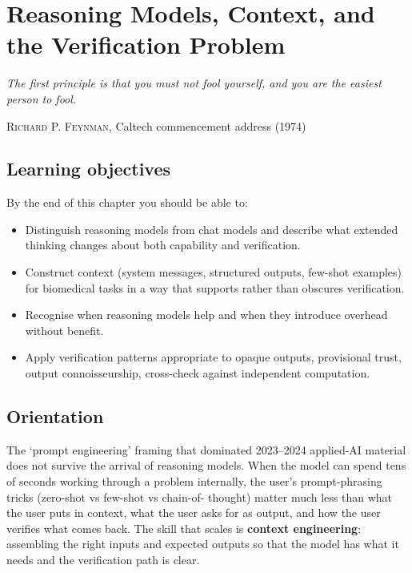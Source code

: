 \documentclass[
  letterpaper,
  11pt]{scrbook}
\providecommand{\tightlist}{%
  \setlength{\itemsep}{0pt}\setlength{\parskip}{0pt}}
\begin{document}
\chapter{Reasoning Models, Context, and the Verification
Problem}\label{sec-reasoning-context}

\begin{flushright}\small

\emph{The first principle is that you must not fool yourself, and you
are the easiest person to fool.}

\textsc{Richard P. Feynman}, Caltech commencement address (1974)

\end{flushright}

\section{Learning objectives}\label{learning-objectives-2}

By the end of this chapter you should be able to:

\begin{itemize}
\tightlist
\item
  Distinguish reasoning models from chat models and describe what
  extended thinking changes about both capability and verification.
\item
  Construct context (system messages, structured outputs, few-shot
  examples) for biomedical tasks in a way that supports rather than
  obscures verification.
\item
  Recognise when reasoning models help and when they introduce overhead
  without benefit.
\item
  Apply verification patterns appropriate to opaque outputs, provisional
  trust, output connoisseurship, cross-check against independent
  computation.
\end{itemize}

\section{Orientation}\label{orientation-2}

The `prompt engineering' framing that dominated 2023--2024 applied-AI
material does not survive the arrival of reasoning models. When the
model can spend tens of seconds working through a problem internally,
the user's prompt-phrasing tricks (zero-shot vs few-shot vs chain-of-
thought) matter much less than what the user puts in context, what the
user asks for as output, and how the user verifies what comes back. The
skill that scales is \textbf{context engineering}: assembling the right
inputs and expected outputs so that the model has what it needs and the
verification path is clear.
\end{document}
